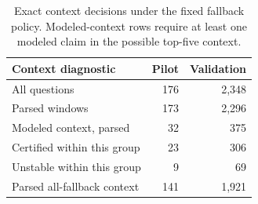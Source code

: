 \begin{table}[t]
\centering\small
\setlength{\tabcolsep}{4pt}
\begin{tabular}{@{}lrr@{}}
\toprule
Context diagnostic & Pilot & Validation\\
\midrule
All questions & 176 & 2,348 \\
Parsed windows & 173 & 2,296 \\
Modeled context, parsed & 32 & 375 \\
Certified within this group & 23 & 306 \\
Unstable within this group & 9 & 69 \\
Parsed all-fallback context & 141 & 1,921 \\
\bottomrule
\end{tabular}
\caption{Exact context decisions under the fixed fallback policy. Modeled-context rows require at least one modeled claim in the possible top-five context.}
\label{tab:mechanism}
\end{table}
